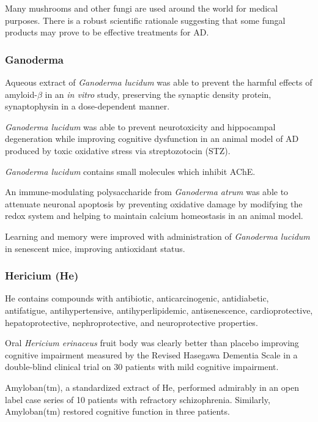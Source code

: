 \documentclass[twocolumn]{article}
\begin{document}
Many mushrooms and other fungi are used around the world for medical purposes.
There is a robust scientific rationale suggesting that some
fungal products may prove to be effective treatments for AD.

\subsubsection{Ganoderma}

Aqueous extract of \textit{Ganoderma lucidum}
was able to prevent the harmful effects of
amyloid-$\beta$ in an \textit{in vitro} study,
preserving the synaptic density protein, synaptophysin
in a dose-dependent manner.
\cite{lai2008antagonizing}

\textit{Ganoderma lucidum} was able to prevent neurotoxicity and
hippocampal degeneration while improving cognitive dysfunction in an animal model
of AD produced by toxic oxidative stress via streptozotocin (STZ).
\cite{zhou2012neuroprotective}

\textit{Ganoderma lucidum} contains small molecules which inhibit AChE.
\cite{lee2011selective}

An immune-modulating polysaccharide from \textit{Ganoderma atrum}
was able to attenuate neuronal apoptosis
by preventing oxidative damage by modifying the
redox system and helping to maintain calcium homeostasis
in an animal model.
\cite{li2011ganoderma}

Learning and memory were improved with
administration of \textit{Ganoderma lucidum}
in senescent mice,
improving antioxidant status.
\cite{wang2004effects}


\subsubsection{Hericium (He)}

He contains compounds with
antibiotic, anticarcinogenic, antidiabetic, antifatigue,
antihypertensive, antihyperlipidemic, antisenescence,
cardioprotective, hepatoprotective, nephroprotective,
and neuroprotective properties.
\cite{friedman2015chemistry}

Oral \textit{Hericium erinaceus} fruit body
was clearly better than placebo
improving cognitive impairment
measured by the Revised Hasegawa Dementia Scale
in a double-blind clinical trial on 30 patients
with mild cognitive impairment.
\cite{mori2009improving}

Amyloban(tm), a standardized extract of He,
performed admirably in an open label case series
of 10 patients with refractory schizophrenia.
\cite{inanaga2014improvement}
Similarly, Amyloban(tm) restored cognitive function
in three patients.
\cite{inanaga2015treatment}
\end{document}
